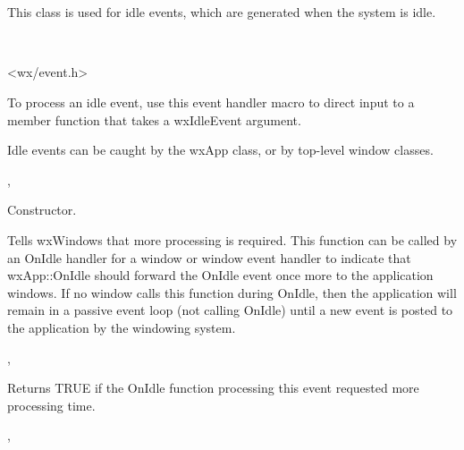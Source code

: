 \section{}\label{wxidleevent}

This class is used for idle events, which are generated when the system is idle.


\\


<wx/event.h>


To process an idle event, use this event handler macro to direct input to a member
function that takes a wxIdleEvent argument.

\twocolwidtha{7cm}
\begin{twocollist}\itemsep=0pt
\end{twocollist}%


Idle events can be caught by the wxApp class, or by top-level window classes.


, 




Constructor.

\label{wxidleeventrequestmore}


Tells wxWindows that more processing is required. This function can be called by an OnIdle
handler for a window or window event handler to indicate that wxApp::OnIdle should
forward the OnIdle event once more to the application windows. If no window calls this function
during OnIdle, then the application will remain in a passive event loop (not calling OnIdle) until a
new event is posted to the application by the windowing system.


, 

\label{wxidleeventmorerequested}


Returns TRUE if the OnIdle function processing this event requested more processing time.


, 

